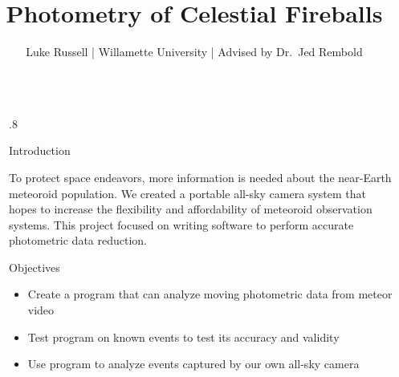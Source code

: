 \documentclass[final]{beamer}
\title{Photometry of Celestial Fireballs} %
\author{Luke Russell | Willamette University | Advised by Dr.~Jed Rembold} %
\newlength{\sepwid}
\newlength{\twocolwid}
\begin{document}

\setlength{\belowcaptionskip}{0ex} %
\setlength\belowdisplayshortskip{2ex} %

\begin{frame}[t] %

\begin{columns}[t] %

\begin{column}{\sepwid}\end{column} %

\begin{column}{.8\twocolwid} %



\begin{block}{Introduction}

To protect space endeavors, more information is needed about the near-Earth meteoroid population. We created a portable all-sky camera system that hopes to increase the flexibility and affordability of meteoroid observation systems. This project focused on writing software to perform accurate photometric data reduction.

\end{block}

\begin{alertblock}{Objectives}

 \begin{itemize}
\item Create a program that can analyze moving photometric data from meteor video
\item Test program on known events to test its accuracy and validity
\item Use program to analyze events captured by our own all-sky camera
\end{itemize}


\end{alertblock}
\end{column}
\end{columns}
\end{frame}
\end{document}
